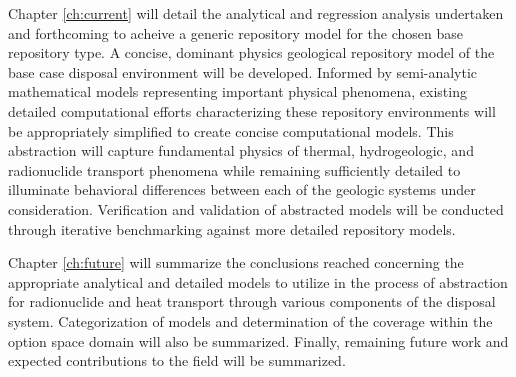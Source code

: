 Chapter \ref{ch:current} will detail the analytical and regression 
analysis undertaken and forthcoming to acheive a generic repository model for the 
chosen base repository type. A concise, dominant physics geological 
repository model of the base case disposal environment will be 
developed. Informed by semi-analytic mathematical models representing 
important physical phenomena, existing detailed computational efforts 
characterizing these repository environments will be appropriately 
simplified to create concise computational models. This abstraction 
will capture fundamental physics of thermal, hydrogeologic, and 
radionuclide transport phenomena while remaining sufficiently detailed 
to illuminate behavioral differences between each of the geologic 
systems under consideration.  Verification and validation of 
abstracted models will be conducted through iterative benchmarking 
against more detailed repository models.

% 

Chapter \ref{ch:future} will summarize the conclusions reached 
concerning the appropriate analytical and detailed models to utilize 
in the process of abstraction for radionuclide and heat transport through 
various components of the disposal system. Categorization of models 
and determination of the coverage within the option space domain will 
also be summarized. Finally, remaining future work and expected 
contributions to the field will be summarized. 
